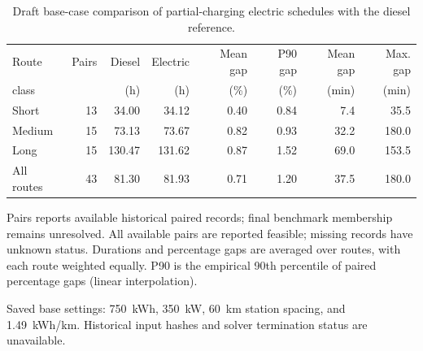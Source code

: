 \begin{table}[htbp]
\centering
\begin{threeparttable}
\caption{Draft base-case comparison of partial-charging electric schedules with the diesel reference.}
\label{tab:conditions_base}
\small\setlength{\tabcolsep}{4pt}
\begin{tabular}{lrrrrrrr}
\toprule
Route & Pairs & Diesel & Electric & Mean gap & P90 gap & Mean gap & Max. gap \\
class & & (h) & (h) & (\%) & (\%) & (min) & (min) \\
\midrule
Short & 13 & 34.00 & 34.12 & 0.40 & 0.84 & 7.4 & 35.5 \\
Medium & 15 & 73.13 & 73.67 & 0.82 & 0.93 & 32.2 & 180.0 \\
Long & 15 & 130.47 & 131.62 & 0.87 & 1.52 & 69.0 & 153.5 \\
\midrule
All routes & 43 & 81.30 & 81.93 & 0.71 & 1.20 & 37.5 & 180.0 \\
\bottomrule
\end{tabular}
\begin{tablenotes}[flushleft]\footnotesize
\item Pairs reports available historical paired records; final benchmark membership remains unresolved. All available pairs are reported feasible; missing records have unknown status. Durations and percentage gaps are averaged over routes, with each route weighted equally. P90 is the empirical 90th percentile of paired percentage gaps (linear interpolation).
\item Saved base settings: 750~kWh, 350~kW, 60~km station spacing, and 1.49~kWh/km. Historical input hashes and solver termination status are unavailable.
\end{tablenotes}
\end{threeparttable}
\end{table}
